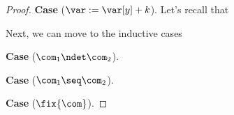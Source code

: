 \begin{proof}
  \medskip
  
  \noindent
  \textbf{Case} (\(\var := \var[y] + k\)).
  Let's recall that
  
  \medskip
  \noindent
  Next, we can move to the inductive cases
  
  \medskip
  
  \noindent
  \textbf{Case} (\(\com_1 \ndet \com_2\)).

  \medskip
  
  \noindent
  \textbf{Case} (\(\com_1 \seq \com_2\)).

  \medskip
  
  \noindent
  \textbf{Case} (\(\fix{\com}\)).
\end{proof}
